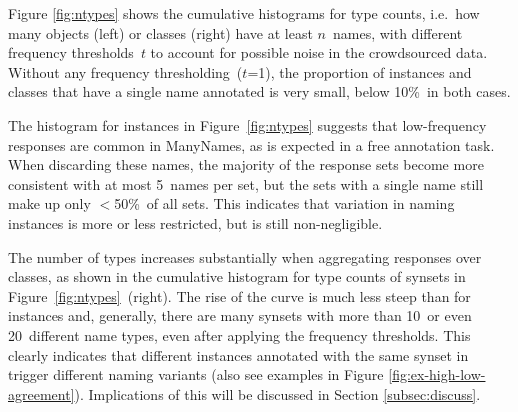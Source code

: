 Figure \ref{fig:ntypes} shows the cumulative histograms for type counts, i.e.\ how many objects (left) or classes (right) have at least $n$\ names, with different frequency thresholds~$t$ to account for possible noise in the crowdsourced data.
Without any frequency thresholding~\mbox{($t$=1)}, the proportion of instances and classes that have a single name annotated is very small, below 10\%\ in both cases. 

The histogram for instances in Figure\ \ref{fig:ntypes} suggests that low-frequency responses are common in ManyNames, as is expected in a free annotation task.
When discarding these names, the %
majority of the response sets become more consistent with at most 5\ names per set, 
but the sets with a single name still make up only $<$50\%\ of all sets. 
This indicates that variation in naming instances is more or less restricted, but is still non-negligible. 

The number of types increases substantially when aggregating responses over classes, as shown in the cumulative histogram for type counts of synsets in Figure\ \ref{fig:ntypes}\ (right).
The rise of the curve is much less steep than for instances and, generally, there are many synsets with more than 10\ or even 20\ different name types, even after applying the frequency thresholds. This clearly indicates that different instances annotated with the same 
synset in \vg trigger different naming variants (also see examples in Figure \ref{fig:ex-high-low-agreement}). 
Implications of this will be discussed in Section \ref{subsec:discuss}.



